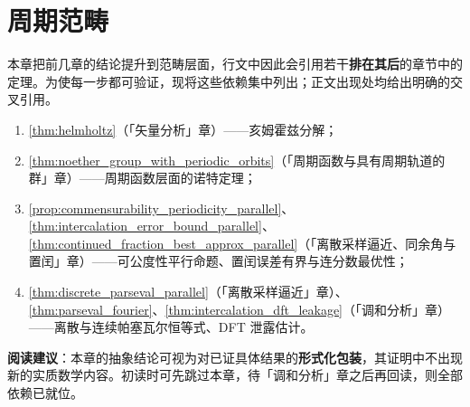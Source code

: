 \chapter{周期范畴}

\begin{remark}[本章的外部依赖与阅读顺序]\label{rem:periodic_category_dependencies}
本章把前几章的结论提升到范畴层面，行文中因此会引用若干\textbf{排在其后}的章节中的定理。为使每一步都可验证，现将这些依赖集中列出；正文出现处均给出明确的交叉引用。
\begin{enumerate}[label=(\roman*)]
    \item \cref{thm:helmholtz}（「矢量分析」章）——亥姆霍兹分解；
    \item \cref{thm:noether_group_with_periodic_orbits}（「周期函数与具有周期轨道的群」章）——周期函数层面的诺特定理；
    \item \cref{prop:commensurability_periodicity_parallel}、\cref{thm:intercalation_error_bound_parallel}、\cref{thm:continued_fraction_best_approx_parallel}（「离散采样逼近、同余角与置闰」章）——可公度性平行命题、置闰误差有界与连分数最优性；
    \item \cref{thm:discrete_parseval_parallel}（「离散采样逼近」章）、\cref{thm:parseval_fourier}、\cref{thm:intercalation_dft_leakage}（「调和分析」章）——离散与连续帕塞瓦尔恒等式、DFT 泄露估计。
\end{enumerate}
\textbf{阅读建议}：本章的抽象结论可视为对已证具体结果的\textbf{形式化包装}，其证明中不出现新的实质数学内容。初读时可先跳过本章，待「调和分析」章之后再回读，则全部依赖已就位。
\end{remark}

